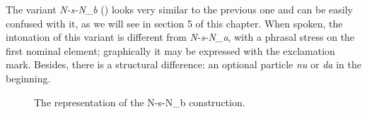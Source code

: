 \documentclass[output=paper]{langscibook}
\begin{document}
The variant \textit{N-s-N\_b} () looks very similar to the previous one and can be easily confused with it, as we will see in section 5 of this chapter. When spoken, the intonation of this variant is different from \textit{N-s-N\_a}, with a phrasal stress on the first nominal element; graphically it may be expressed with the exclamation mark. Besides, there is a structural difference: an optional particle \textit{nu} or \textit{da} in the beginning.


\begin{sidewaysfigure}
\caption{\label{fig:mikhailov:3}The representation of the N-s-N\_b construction.}
\end{sidewaysfigure}
\end{document}
